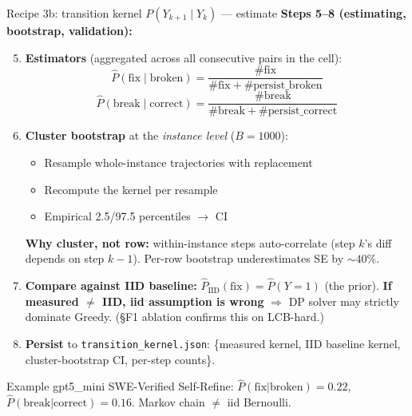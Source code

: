 \documentclass[10pt]{beamer}
\newcommand{\bad}[1]{\textcolor{accentRed}{\textbf{#1}}}
\newcommand{\warn}[1]{\textcolor{accentOrange}{\textbf{#1}}}
\newcommand{\info}[1]{\textcolor{primaryBlue}{\textbf{#1}}}
\begin{document}
\begin{frame}{Recipe 3b: transition kernel \textcolor{accentRed}{$P(Y_{k+1}\mid Y_k)$} --- estimate}
\vspace{0.1cm}
\textbf{Steps 5--8 (estimating, bootstrap, validation):}
\begin{enumerate}\setcounter{enumi}{4}
\item \info{Estimators} (aggregated across all consecutive pairs in the cell):
  \[
  \hat{P}(\text{fix}\mid\text{broken}) = \frac{\#\text{fix}}{\#\text{fix}+\#\text{persist\_broken}}
  \]
  \[
  \hat{P}(\text{break}\mid\text{correct}) = \frac{\#\text{break}}{\#\text{break}+\#\text{persist\_correct}}
  \]

\item \warn{Cluster bootstrap} at the \emph{instance level} ($B{=}1000$):
  \begin{itemize}
  \item Resample whole-instance trajectories with replacement
  \item Recompute the kernel per resample
  \item Empirical 2.5/97.5 percentiles $\to$ CI
  \end{itemize}
  \warn{Why cluster, not row:} within-instance steps auto-correlate
  (step $k$'s diff depends on step $k{-}1$). Per-row bootstrap
  underestimates SE by ${\sim}40\%$.

\item \info{Compare against IID baseline:} $\hat{P}_{\text{IID}}(\text{fix}) =
  \hat{P}(Y{=}1)$ (the prior). \bad{If measured $\neq$ IID, iid assumption is
  wrong} $\Rightarrow$ DP solver may strictly dominate Greedy. (\S F1
  ablation confirms this on LCB-hard.)

\item \info{Persist} to \texttt{transition\_kernel.json}:
  \{measured kernel, IID baseline kernel, cluster-bootstrap CI, per-step
  counts\}.
\end{enumerate}

\textcolor{softGrey}{\scriptsize Example gpt5\_mini SWE-Verified Self-Refine:
$\hat{P}(\text{fix}|\text{broken}) = 0.22$, $\hat{P}(\text{break}|\text{correct}) = 0.16$.
Markov chain $\neq$ iid Bernoulli.}
\end{frame}
\end{document}
